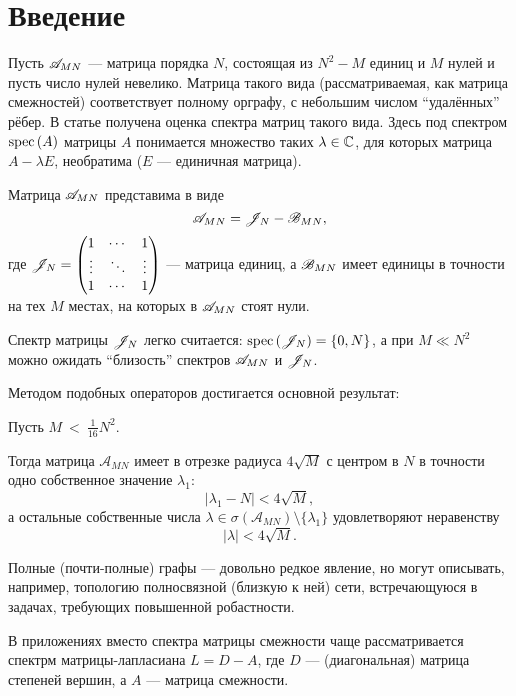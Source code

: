 \section{Введение}

Пусть \( \mathscr{A}_{{M}{N}} \) --- матрица порядка \( N \),
состоящая из \( N^2 - M \) единиц и \( M \) нулей
и пусть число нулей невелико.
Матрица такого вида (рассматриваемая, как матрица смежностей) соответствует
полному орграфу, с небольшим числом ``удалённых'' рёбер.
В статье получена оценка спектра
матриц такого вида.
Здесь под спектром \( \mathrm{spec}\left({A}\right) \) матрицы \( A \)
понимается множество таких \( \lambda\in\mathbb{C} \), для которых
матрица \( A - \lambda E \), необратима (\( E \) --- единичная матрица).

Матрица \( \mathscr{A}_{{M}{N}} \) представима в виде
\[
    \mathscr{A}_{{M}{N}} = \mathscr{J}_{N} - \mathscr{B}_{{M}{N}},
    \]
где \(
\mathscr{J}_{N} =
\begin{pmatrix}1 & \cdots & 1 \\
\vdots & \ddots & \vdots \\
1 & \cdots & 1
\end{pmatrix} \) --- матрица единиц,
а \( \mathscr{B}_{{M}{N}} \) имеет единицы в точности на тех \( M \)
местах, на которых в \( \mathscr{A}_{{M}{N}} \) стоят нули.

Спектр матрицы \( \mathscr{J}_{N} \) легко считается:
\( \mathrm{spec}\left({\mathscr{J}_{N}}\right) = \left\{0, N \right\} \),
а при \( M \ll N^2 \) можно ожидать ``близость'' спектров
\( \mathscr{A}_{{M}{N}} \) и \( \mathscr{J}_{N} \).

Методом подобных операторов \cite{baskakov-harmonic}
достигается основной результат:
\begin{thm}\label{thm:almostallones-spectra}
    Пусть
    \(M~<~\displaystyle{\frac{1}{16}N^2}. \)

Тогда матрица \( \mathcal{A}_{MN} \) имеет в отрезке
    радиуса \( 4\sqrt{M} \) с центром в \( N \)
    в точности одно собственное значение \( \lambda_1 \):
    \[ \lvert \lambda_1 - N \rvert < 4\sqrt{M}, \]
    а остальные собственные числа
    \( \lambda\in\sigma\left({\mathcal{A}_{MN}}\right)\setminus\{\lambda_1\} \)
    удовлетворяют неравенству
    \[ \lvert \lambda \rvert < 4\sqrt{M}. \]
\end{thm}

Полные (почти-полные) графы --- довольно редкое явление,
но могут описывать, например, топологию полносвязной (близкую к ней) сети,
встречающуюся в задачах, требующих повышенной робастности.

В приложениях вместо спектра матрицы смежности чаще рассматривается
спектрм матрицы-лапласиана \( L = D - A \),
где \( D \) --- (диагональная) матрица степеней вершин,
а \( A \) --- матрица смежности.

